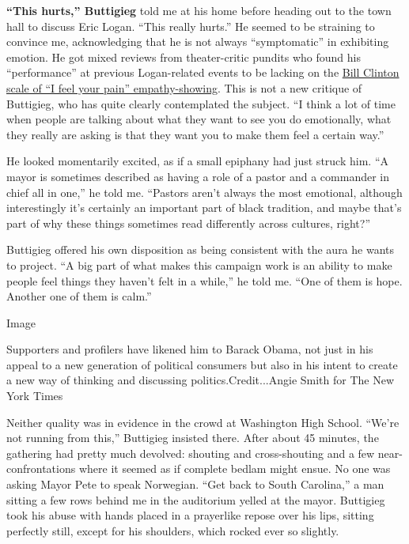 \textbf{``This hurts,'' Buttigieg} told me at his home before heading
out to the town hall to discuss Eric Logan. ``This really hurts.'' He
seemed to be straining to convince me, acknowledging that he is not
always ``symptomatic'' in exhibiting emotion. He got mixed reviews from
theater-critic pundits who found his ``performance'' at previous
Logan-related events to be lacking on the
\href{https://video.wgbh.org/video/american-experience-clinton-and-crisis-the-oklahoma-city-bombing/}{Bill
Clinton scale of ``I feel your pain'' empathy-showing}. This is not a
new critique of Buttigieg, who has quite clearly contemplated the
subject. ``I think a lot of time when people are talking about what they
want to see you do emotionally, what they really are asking is that they
want you to make them feel a certain way.''

He looked momentarily excited, as if a small epiphany had just struck
him. ``A mayor is sometimes described as having a role of a pastor and a
commander in chief all in one,'' he told me. ``Pastors aren't always the
most emotional, although interestingly it's certainly an important part
of black tradition, and maybe that's part of why these things sometimes
read differently across cultures, right?''

Buttigieg offered his own disposition as being consistent with the aura
he wants to project. ``A big part of what makes this campaign work is an
ability to make people feel things they haven't felt in a while,'' he
told me. ``One of them is hope. Another one of them is calm.''

Image

Supporters and profilers have likened him to Barack Obama, not just in
his appeal to a new generation of political consumers but also in his
intent to create a new way of thinking and discussing
politics.Credit...Angie Smith for The New York Times

Neither quality was in evidence in the crowd at Washington High School.
``We're not running from this,'' Buttigieg insisted there. After about
45 minutes, the gathering had pretty much devolved: shouting and
cross-shouting and a few near-confrontations where it seemed as if
complete bedlam might ensue. No one was asking Mayor Pete to speak
Norwegian. ``Get back to South Carolina,'' a man sitting a few rows
behind me in the auditorium yelled at the mayor. Buttigieg took his
abuse with hands placed in a prayerlike repose over his lips, sitting
perfectly still, except for his shoulders, which rocked ever so
slightly.

